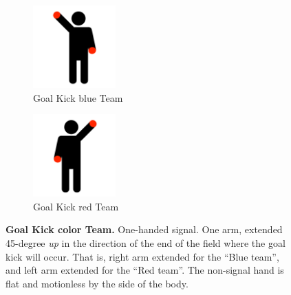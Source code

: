\begin{figure}[ht!]
    \centering
    \begin{subfigure}{.33\textwidth}
        \centering
        \includegraphics[height=120px]{figs/technical_challenges/goal-kick.png}
        \caption{\color{blue}Goal Kick \textlangle{}blue\textrangle{} Team}
    \end{subfigure}
    \begin{subfigure}{.33\textwidth}
        \centering
        \includegraphics[height=120px]{figs/technical_challenges/goal-kick-flipped.png}
        \caption{\color{red}Goal Kick \textlangle{}red\textrangle{} Team}
    \end{subfigure}
    \caption{\textbf{Goal Kick \textlangle{}color\textrangle{} Team.} One-handed signal. One arm, extended 45-degree \emph{up} in the direction of the end of the field where the goal kick will occur. That is, right arm extended for the ``Blue team'', and left arm extended for the ``Red team''. The non-signal hand is flat and motionless by the side of the body.}
\end{figure}


